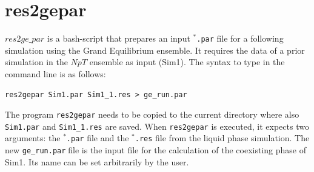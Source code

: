 \section{res2gepar}
\label{sec:res2gepar}

$res2ge\_par$ is a bash-script that prepares an input \texttt{$^{*}$\hspace{-3pt}.par} file for a following simulation using the Grand Equilibrium ensemble. It requires the data of a prior simulation in the $NpT$ ensemble as input (Sim1). The syntax to type in the command line is as follows:
\begin{Verbatim}
res2gepar Sim1.par Sim1_1.res > ge_run.par
\end{Verbatim}
The program \texttt{res2gepar} needs to be copied to the current directory where also \texttt{Sim1.par} and \texttt{Sim1\_1.res} are saved. When \texttt{res2gepar} is executed, it expects two arguments: the \texttt{$^{*}$\hspace{-3pt}.par} file and the \texttt{$^{*}$\hspace{-3pt}.res} file from the liquid phase simulation. The new \texttt{ge\_run.par}file is the input file for the calculation of the coexisting phase of Sim1. Its name can be set arbitrarily by the user. 









